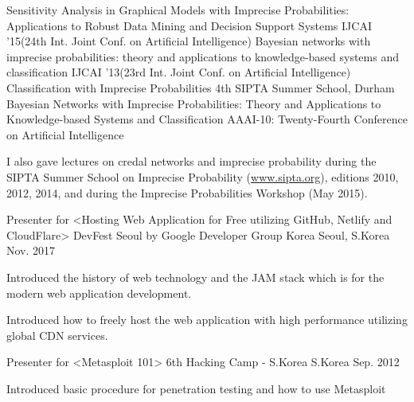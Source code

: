 \begin{cventries}

{Sensitivity Analysis in Graphical Models with Imprecise Probabilities: Applications to Robust Data Mining and Decision Support Systems}
{IJCAI '15}{(24th Int. Joint Conf. on Artificial Intelligence)}{}
{Bayesian networks with imprecise probabilities: theory and applications to knowledge-based systems and classification}
{IJCAI '13}{(23rd Int. Joint Conf. on Artificial Intelligence)}{}
{Classification with Imprecise Probabilities}
{4th SIPTA Summer School, Durham}{}{}
{Bayesian Networks with Imprecise Probabilities: Theory and Applications to Knowledge-based Systems and Classification}
{ AAAI-10: Twenty-Fourth Conference on Artificial Intelligence}{}{}

I also gave lectures on credal networks and imprecise probability during the SIPTA Summer School on Imprecise Probability (\url{www.sipta.org}), editions 2010, 2012, 2014, and during the Imprecise Probabilities Workshop (May 2015).



  \cventry
    {Presenter for <Hosting Web Application for Free utilizing GitHub, Netlify and CloudFlare>} %
    {DevFest Seoul by Google Developer Group Korea} %
    {Seoul, S.Korea} %
    {Nov. 2017} %
    {
      \begin{cvitems} %
        \item {Introduced the history of web technology and the JAM stack which is for the modern web application development.}
        \item {Introduced how to freely host the web application with high performance utilizing global CDN services.}
      \end{cvitems}
    }
  \cventry
    {Presenter for <Metasploit 101>} %
    {6th Hacking Camp - S.Korea} %
    {S.Korea} %
    {Sep. 2012} %
    {
      \begin{cvitems} %
        \item {Introduced basic procedure for penetration testing and how to use Metasploit}
      \end{cvitems}
    }
\end{cventries}
